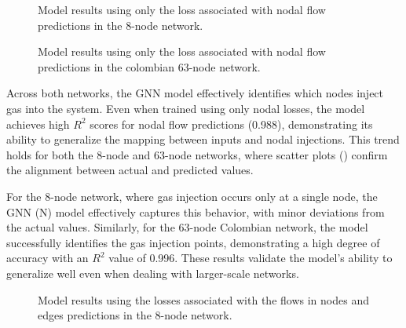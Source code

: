 \begin{figure}
    \centering
    \setlength{}        
    \setlength{} 
    
    \caption{Model results using only the loss associated with nodal flow predictions in the 8-node network.}
    \label{fig:dummy_base_results}
\end{figure}

\begin{figure}
    \centering
        \setlength{}        
        \setlength{} 
    \caption{Model results using only the loss associated with nodal flow predictions in the colombian 63-node network.}
    \label{fig:lineal_col_base_results}
\end{figure}

Across both networks, the GNN model effectively identifies which nodes inject gas into the system. Even when trained using only nodal losses, the model achieves high $R^2$ scores for nodal flow predictions (0.988), demonstrating its ability to generalize the mapping between inputs and nodal injections. This trend holds for both the 8-node and 63-node networks, where scatter plots () confirm the alignment between actual and predicted values.

For the 8-node network, where gas injection occurs only at a single node, the GNN (N) model effectively captures this behavior, with minor deviations from the actual values. Similarly, for the 63-node Colombian network, the model successfully identifies the gas injection points, demonstrating a high degree of accuracy with an $R^2$ value of 0.996. These results validate the model's ability to generalize well even when dealing with larger-scale networks.

\begin{figure}
    \centering
        \setlength{}        
        \setlength{} 
        \caption{Model results using the losses associated with the flows in nodes and edges predictions in the 8-node network.}
        \label{fig:dummy_base_f_results}
\end{figure}


